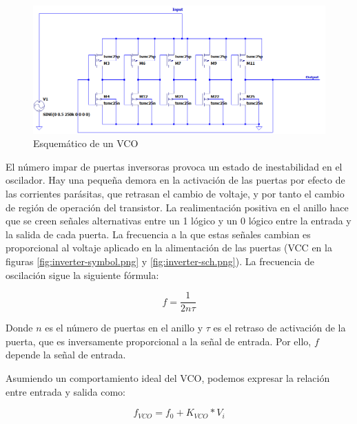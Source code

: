 \documentclass[12pt]{report} %
\begin{document}
	\begin{figure}[H]
		\includegraphics[width=\textwidth]{vco-sch.png}
		\caption[Esquemático de un VCO]{Esquemático de un VCO}
		\label{fig:vco-sch.png}
	\end{figure}
	
	El número impar de puertas inversoras provoca un estado de inestabilidad en el oscilador. Hay una pequeña demora en la activación de las puertas por efecto de las corrientes parásitas, que retrasan el cambio de voltaje, y por tanto el cambio de región de operación del transistor. La realimentación positiva en el anillo hace que se creen señales alternativas entre un 1 lógico y un 0 lógico entre la entrada y la salida de cada puerta. La frecuencia a la que estas señales cambian es proporcional al voltaje aplicado en la alimentación de las puertas (VCC en la figuras \ref{fig:inverter-symbol.png} y \ref{fig:inverter-sch.png}). La frecuencia de oscilación sigue la siguiente fórmula:
	
	\begin{figure}[H]
		\begin{equation}
			\label{vco-freq-sw-t}
			f = \frac{1}{2 n \tau}
		\end{equation}
		\footnotemark
	\end{figure}
	
	Donde $n$ es el número de puertas en el anillo y $\tau$ es el retraso de activación de la puerta, que es inversamente proporcional a la señal de entrada. Por ello, $f$ depende la señal de entrada.
	
	Asumiendo un comportamiento ideal del VCO, podemos expresar la relación entre entrada y salida como:
	\begin{figure}[H]
		\begin{equation}
			\label{vco-freq-ideal}
			f_{VCO}= f_{0} + K_{VCO} * V_{i}
		\end{equation}
		\footnotemark
	\end{figure}
	
\end{document}
